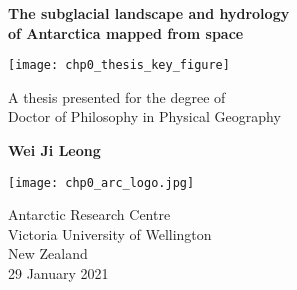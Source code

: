\begin{titlepage}
  \begin{center}

    \LARGE
    \textbf{
      The subglacial landscape and hydrology \\
      of Antarctica mapped from space
    }

    \texttt{[image: chp0\_thesis\_key\_figure]}

    \Large
    A thesis presented for the degree of\\
    Doctor of Philosophy in Physical Geography

    \vspace{0.8cm}

    \textbf{Wei Ji Leong}

    \texttt{[image: chp0\_arc\_logo.jpg]}

    \Large
    Antarctic Research Centre\\
    Victoria University of Wellington\\
    New Zealand\\
    29 January 2021

  \end{center}
\end{titlepage}
